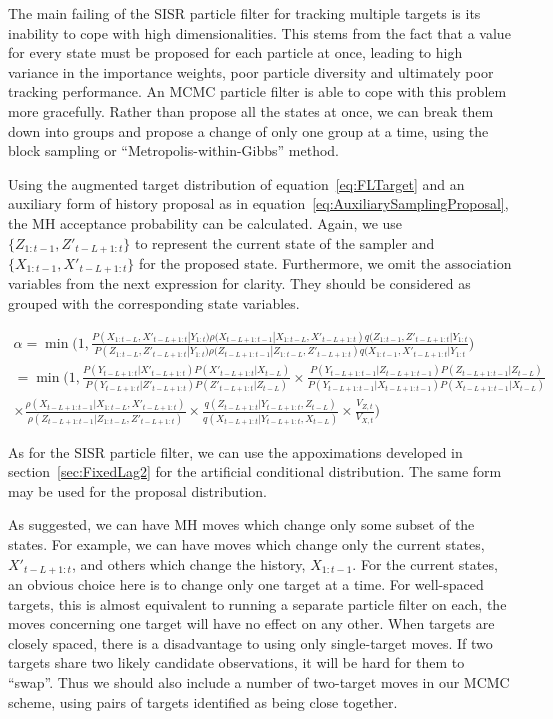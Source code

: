 The main failing of the SISR particle filter for tracking multiple targets is its inability to cope with high dimensionalities. This stems from the fact that a value for every state must be proposed for each particle at once, leading to high variance in the importance weights, poor particle diversity and ultimately poor tracking performance. An MCMC particle filter is able to cope with this problem more gracefully. Rather than propose all the states at once, we can break them down into groups and propose a change of only one group at a time, using the block sampling or ``Metropolis-within-Gibbs'' method.

Using the augmented target distribution of equation~\ref{eq:FLTarget} and an auxiliary form of history proposal as in equation~\ref{eq:AuxiliarySamplingProposal}, the MH acceptance probability can be calculated. Again, we use $\{Z_{1:t-1}, Z'_{t-L+1:t}\}$ to represent the current state of the sampler and $\{X_{1:t-1}, X'_{t-L+1:t}\}$ for the proposed state. Furthermore, we omit the association variables from the next expression for clarity. They should be considered as grouped with the corresponding state variables.

\begin{multline}
\alpha = \min \bigg ( 1,  \frac{ P(X_{1:t-L}, X'_{t-L+1:t}|Y_{1:t}) \rho(X_{t-L+1:t-1}|X_{1:t-L}, X'_{t-L+1:t}) q(Z_{1:t-1}, Z'_{t-L+1:t}|Y_{1:t} }{ P(Z_{1:t-L}, Z'_{t-L+1:t}|Y_{1:t}) \rho(Z_{t-L+1:t-1}|Z_{1:t-L}, Z'_{t-L+1:t}) q(X_{1:t-1}, X'_{t-L+1:t}|Y_{1:t} }  \bigg ) \\
= \min \bigg ( 1,  \frac{ P(Y_{t-L+1:t}|X'_{t-L+1:t})P(X'_{t-L+1:t}|X_{t-L}) }{ P(Y_{t-L+1:t}|Z'_{t-L+1:t})P(Z'_{t-L+1:t}|Z_{t-L}) } 
\times \frac{ P(Y_{t-L+1:t-1}|Z_{t-L+1:t-1})P(Z_{t-L+1:t-1}|Z_{t-L}) }{ P(Y_{t-L+1:t-1}|X_{t-L+1:t-1})P(X_{t-L+1:t-1}|X_{t-L}) } \\
 \times \frac{\rho(X_{t-L+1:t-1}|X_{1:t-L}, X'_{t-L+1:t})}{\rho(Z_{t-L+1:t-1}|Z_{1:t-L}, Z'_{t-L+1:t})} \times \frac{q(Z_{t-L+1:t}|Y_{t-L+1:t}, Z_{t-L})}{q(X_{t-L+1:t}|Y_{t-L+1:t}, X_{t-L})} \times \frac{V_{Z,t}}{V_{X,t}}  \bigg )
\label{eq:FLAcceptance}
\end{multline}

As for the SISR particle filter, we can use the appoximations developed in section~\ref{sec:FixedLag2} for the artificial conditional distribution. The same form may be used for the proposal distribution.

As suggested, we can have MH moves which change only some subset of the states. For example, we can have moves which change only the current states, $X'_{t-L+1:t}$, and others which change the history, $X_{1:t-1}$. For the current states, an obvious choice here is to change only one target at a time. For well-spaced targets, this is almost equivalent to running a separate particle filter on each, the moves concerning one target will have no effect on any other. When targets are closely spaced, there is a disadvantage to using only single-target moves. If two targets share two likely candidate observations, it will be hard for them to ``swap''. Thus we should also include a number of two-target moves in our MCMC scheme, using pairs of targets identified as being close together.


